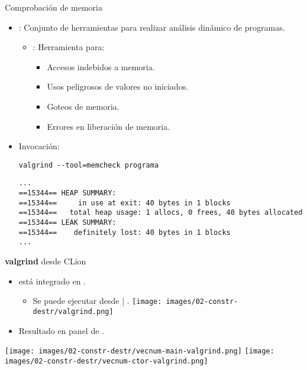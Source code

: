 \begin{frame}[fragile]{Comprobación de memoria}
\begin{itemize}
  \item {}: 
        Conjunto de herramientas para realizar análisis dinámico de programas.
    \begin{itemize}
      \item {}: Herramienta para:
        \begin{itemize}
          \item Accesos indebidos a memoria.
          \item Usos peligrosos de valores no iniciados.
          \item Goteos de memoria.
          \item Errores en liberación de memoria.
        \end{itemize}
    \end{itemize}
  \item Invocación:
\begin{lstlisting}[style=terminal]
valgrind --tool=memcheck programa
\end{lstlisting}
\begin{lstlisting}[style=terminal]
...
==15344== HEAP SUMMARY:
==15344==     in use at exit: 40 bytes in 1 blocks
==15344==   total heap usage: 1 allocs, 0 frees, 40 bytes allocated
==15344== LEAK SUMMARY:
==15344==    definitely lost: 40 bytes in 1 blocks
...
\end{lstlisting}
\end{itemize}
\end{frame}

\begin{frame}[t]{\textbf{valgrind} desde CLion}
\begin{itemize}
  \item {} está integrado en .
    \begin{itemize}
      \item Se puede ejecutar desde  | .
      \texttt{[image: images/02-constr-destr/valgrind.png]}
    \end{itemize}
  \item Resultado en panel de .
\end{itemize}
\texttt{[image: images/02-constr-destr/vecnum-main-valgrind.png]}
\texttt{[image: images/02-constr-destr/vecnum-ctor-valgrind.png]}
\end{frame}

